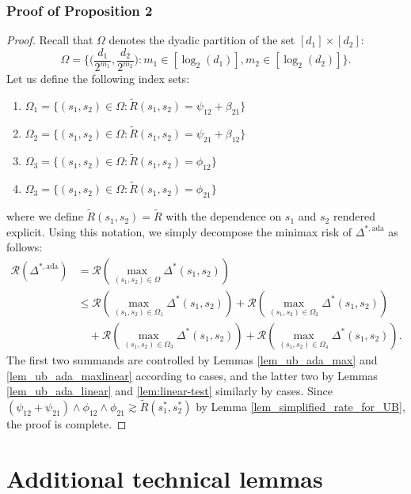 \documentclass{article}
\newcommand{\cR}{\mathcal{R}}
\theoremstyle{remark}
\begin{document}
\subsubsection{Proof of Proposition 2}
\begin{proof}
Recall that $\Omega$ denotes the dyadic partition of the set $[d_1] \times [d_2]$:
\[
    \Omega = \Bigg\{\Big(\frac{d_1}{2^{m_1}}, \frac{d_2}{2^{m_2}}\Big): m_1 \in [\log_2(d_1)], m_2 \in [\log_2(d_2)]  \Bigg\}.
\]
Let us define the following index sets:
    \begin{enumerate}
        \item $\Omega_1 = \Big\{(s_1, s_2) \in \Omega : \tilde{R}(s_1, s_2) = \psi_{12} + \beta_{21} \Big\}$
        \item $\Omega_2 = \Big\{(s_1, s_2) \in \Omega : \tilde{R}(s_1, s_2) = \psi_{21} + \beta_{12} \Big\}$
        \item $\Omega_3 = \Big\{(s_1, s_2) \in \Omega : \tilde{R}(s_1, s_2) = \phi_{12} \Big\}$ 
        \item $\Omega_3 = \Big\{(s_1, s_2) \in \Omega : \tilde{R}(s_1, s_2) = \phi_{21} \Big\}$
    \end{enumerate}
    where we define $\tilde{R}(s_1, s_2) = \tilde{R}$ with the dependence on $s_1$ and $s_2$ rendered explicit. Using this notation, we simply decompose the minimax risk of $\Delta^{*, \text{ada}}$ as follows:
    \begin{align*}
        \cR(\Delta^{*, \text{ada}}) &= \cR\left(\max_{(s_1, s_2) \in \Omega}\Delta^*(s_1, s_2)\right) \\
        &\leq \cR\left(\max_{(s_1, s_2) \in \Omega_1
         }\Delta^*(s_1, s_2)\right) + \cR\left(\max_{(s_1, s_2) \in \Omega_2
         }\Delta^*(s_1, s_2)\right) \\
         &\quad + \cR\left(\max_{(s_1, s_2) \in \Omega_3
         }\Delta^*(s_1, s_2)\right) + \cR\left(\max_{(s_1, s_2) \in \Omega_4
         }\Delta^*(s_1, s_2)\right).
    \end{align*}
    The first two summands are controlled by Lemmas \ref{lem_ub_ada_max} and \ref{lem_ub_ada_maxlinear} according to cases, and the latter two by Lemmas \ref{lem_ub_ada_linear} and \ref{lem:linear-test} similarly by cases. Since $(\psi_{12} + \psi_{21}) \land \phi_{12} \land \phi_{21} \gtrsim \tilde R(s_1^*, s_2^*)$ by Lemma \ref{lem_simplified_rate_for_UB}, the proof is complete.
\end{proof}
\section{Additional technical lemmas}
\end{document}
